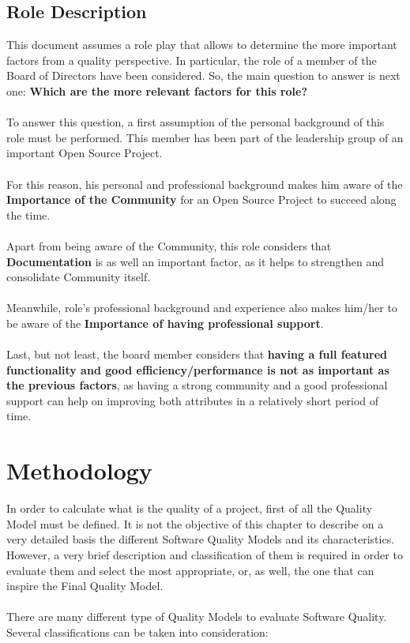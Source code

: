 \documentclass[11pt]{article}
\begin{document}
\begin{itemize}
\subsection{Role Description} \label{sec:roledesc}
This document assumes a role play that allows to determine the more important factors from a quality perspective. In particular, the role of a member of the Board of Directors have been considered. So, the main question to answer is next one: \textbf{Which are the more relevant factors for this role?}\\
\\
To answer this question, a first assumption of the personal background of this role must be performed. This member has been part of the leadership group of an important Open Source Project.\\
\\
For this reason, his personal and professional background makes him aware of the \textbf{Importance of the Community} for an Open Source Project to succeed along the time.\\
\\
Apart from being aware of the Community, this role considers that \textbf{Documentation} is as well an important factor, as it helps to strengthen and consolidate Community itself.\\
\\
Meanwhile, role's professional background and experience also makes him/her to be aware of the \textbf{Importance of having professional support}.\\
\\
Last, but not least, the board member considers that \textbf{having a full featured functionality and good efficiency/performance is not as important as the previous factors}, as having a strong community and a good professional support can help on improving both attributes in a relatively short period of time.
\end{itemize}

\section{Methodology} \label{sec:methodology}
In order to calculate what is the quality of a project, first of all the Quality Model must be defined. It is not the objective of this chapter to describe on a very detailed basis the different Software Quality Models and its characteristics. However, a very brief description and classification of them is required in order to evaluate them and select the most appropriate, or, as well, the one that can inspire the Final Quality Model.\\
\\
There are many different type of Quality Models to evaluate Software Quality. Several classifications can be taken into consideration:
\end{document}
